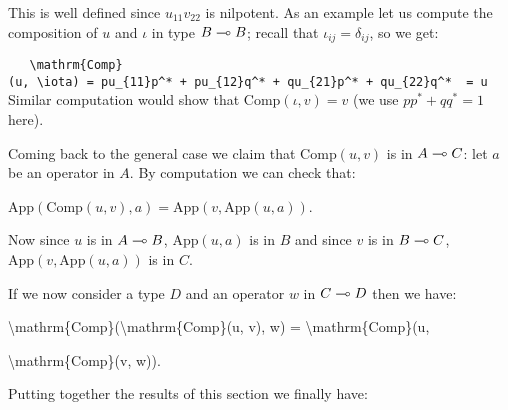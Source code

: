 This is well defined since \(u_{11}v_{22}\) is nilpotent. As an example
let us compute the composition of \(u\) and \(\iota\) in type
\(B\multimap B\); recall that \(\iota_{ij} = \delta_{ij}\), so we get:

\begin{description}
\tightlist
\item[]
\end{description}

\texttt{~~~\textbackslash{}mathrm\{Comp\}(u,~\textbackslash{}iota)~=~pu\_\{11\}p\^{}*~+~pu\_\{12\}q\^{}*~+~qu\_\{21\}p\^{}*~+~qu\_\{22\}q\^{}*~~=~u}\\

Similar computation would show that \(\mathrm{Comp}(\iota, v) = v\) (we
use \(pp^* + qq^* = 1\) here).

Coming back to the general case we claim that \(\mathrm{Comp}(u, v)\) is
in \(A\multimap C\): let \(a\) be an operator in \(A\). By computation we
can check that:

\begin{description}
\tightlist
\item[]
\(\mathrm{App}(\mathrm{Comp}(u, v), a) = \mathrm{App}(v, \mathrm{App}(u, a))\).
\end{description}

Now since \(u\) is in \(A\multimap B\), \(\mathrm{App}(u, a)\) is in \(B\)
and since \(v\) is in \(B\multimap C\),
\(\mathrm{App}(v, \mathrm{App}(u, a))\) is in \(C\).

If we now consider a type \(D\) and an operator \(w\) in \(C\multimap D\)
then we have:

\begin{description}
\tightlist
\item[]
\textbackslash{}mathrm\{Comp\}(\textbackslash{}mathrm\{Comp\}(u, v), w)
= \textbackslash{}mathrm\{Comp\}(u,
\end{description}

\textbackslash{}mathrm\{Comp\}(v, w)).

Putting together the results of this section we finally have:



